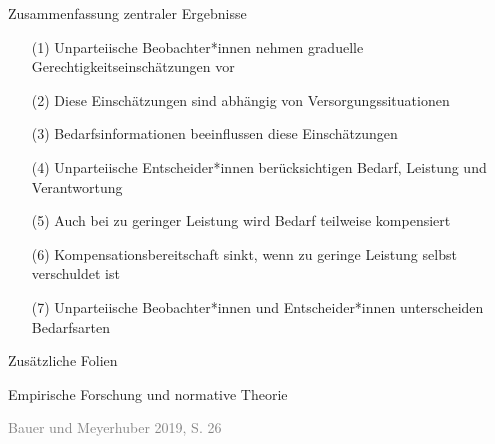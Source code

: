 \documentclass[xcolor=table,9pt,aspectratio=169]{beamer}
\begin{document}
\begin{frame}{\vspace*{10mm}Zusammenfassung zentraler Ergebnisse}
\vspace*{-10mm}
\begin{itemize}
   \item[(1)] Unparteiische Beobachter*innen nehmen graduelle Gerechtigkeitseinschätzungen vor
   \item[(2)] Diese Einschätzungen sind abhängig von Versorgungssituationen
   \item[(3)] Bedarfsinformationen beeinflussen diese Einschätzungen
\end{itemize}

\vspace{1em}
\begin{itemize}
   \item[(4)] Unparteiische Entscheider*innen berücksichtigen Bedarf, Leistung und Verantwortung
   \item[(5)] Auch bei zu geringer Leistung wird Bedarf teilweise kompensiert
   \item[(6)] Kompensationsbereitschaft sinkt, wenn zu geringe Leistung selbst verschuldet ist
\end{itemize}

\vspace{1em}
\begin{itemize}
   \item[(7)] Unparteiische Beobachter*innen und Entscheider*innen unterscheiden Bedarfsarten
\end{itemize}
\end{frame}


\begin{frame}
\begin{overlayarea}{\textwidth}{0.81\paperheight}
   {
   \vspace*{11mm}
   \textcolor{uolblue}
   {Zusätzliche Folien}
   }
\end{overlayarea}
\end{frame}


\begin{frame}{\vspace*{10mm}Empirische Forschung und normative Theorie}

\textcolor{gray}{Bauer und Meyerhuber 2019, S. 26}
\end{frame}
\end{document}
